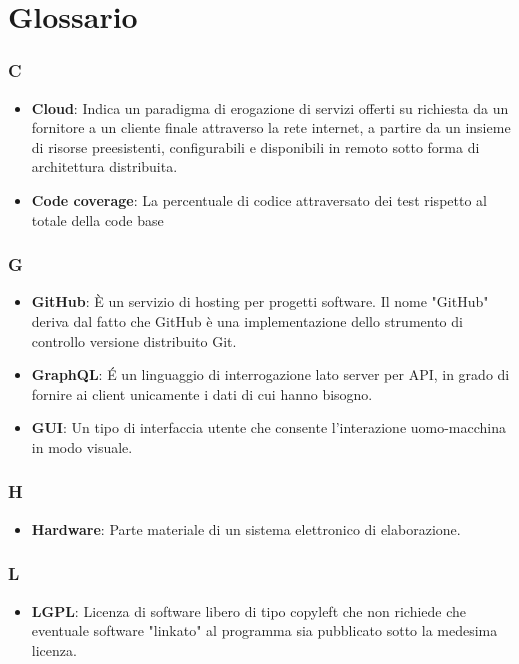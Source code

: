 \appendix

\section{Glossario}

\subsubsection*{C}
\begin{itemize}
	\item \textbf{Cloud}: Indica un paradigma di erogazione di servizi offerti su richiesta da un fornitore a un cliente finale attraverso la rete internet, a partire da un insieme di risorse preesistenti, configurabili e disponibili in remoto sotto forma di architettura distribuita. 
	\item \textbf{Code coverage}: La percentuale di codice attraversato dei test rispetto al totale della code base
\end{itemize}

\subsubsection*{G}
\begin{itemize}
	\item \textbf{GitHub}: È un servizio di hosting per progetti software. Il nome "GitHub" deriva dal fatto che GitHub è una implementazione dello strumento di controllo versione distribuito Git.
	\item \textbf{GraphQL}: É un linguaggio di interrogazione lato server per API, in grado di fornire ai client unicamente i dati di cui hanno bisogno.
	\item \textbf{GUI}: Un tipo di interfaccia utente che consente l'interazione uomo-macchina in modo visuale. 
\end{itemize}

\subsubsection*{H}
\begin{itemize}
	\item \textbf{Hardware}: Parte materiale di un sistema elettronico di elaborazione.
\end{itemize}

\subsubsection*{L}
\begin{itemize}
	\item \textbf{LGPL}: Licenza di software libero di tipo copyleft che non richiede che eventuale software "linkato" al programma sia pubblicato sotto la medesima licenza.
\end{itemize}


